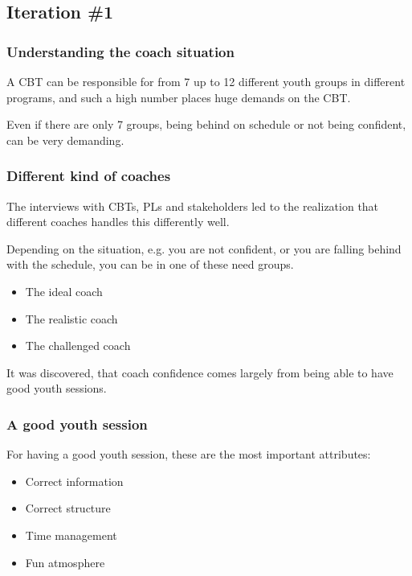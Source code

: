\subsection{Iteration \#1}

\subsubsection{Understanding the coach situation}

A CBT can be responsible for from 7 up to 12 different youth groups in different programs, and such a high number places huge demands on the CBT.

Even if there are only 7 groups, being behind on schedule or not being confident, can be very demanding.

\subsubsection{Different kind of coaches}

The interviews with CBTs, PLs and stakeholders led to the realization that different coaches handles this differently well.

Depending on the situation, e.g. you are not confident, or you are falling behind with the schedule, you can be in one of these need groups.

\begin{itemize}
  \item The ideal coach
  \item The realistic coach
  \item The challenged coach
\end{itemize}

It was discovered, that coach confidence comes largely from being able to have good youth sessions.

\subsubsection{A good youth session}

For having a good youth session, these are the most important attributes:

\begin{itemize}
  \item Correct information
  \item Correct structure
  \item Time management
  \item Fun atmosphere
\end{itemize}

